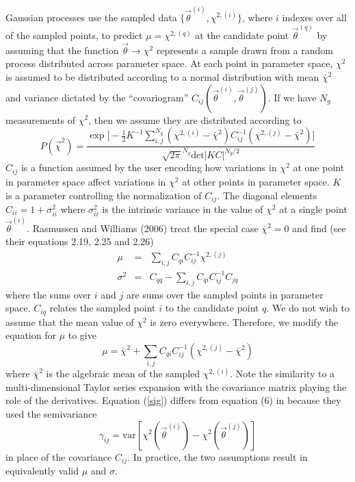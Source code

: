 \documentclass[useAMS,usenatbib]{aastex}
\begin{document}
Gaussian processes use the sampled data $\{\vec{\theta}^{(i)},\chi^{2,(i)}\}$, 
where $i$ indexes over all of the sampled points, to predict
$\mu=\chi^{2,(q)}$ at the candidate point 
$\vec{\theta}^{(q)}$ by assuming that the function
$\vec{\theta}\rightarrow\chi^2$ represents a sample drawn from a random process 
distributed
across parameter space.  At each point in parameter space, 
$\chi^2$ is assumed to be
distributed according to a normal distribution with mean 
$\bar{\chi}^2$
and variance dictated by the ``covariogram''
$C_{ij}(\vec{\theta}^{(i)},\vec{\theta}^{(j)})$.
If we have $N_g$ measurements of $\chi^2$, then we assume
they are distributed according to
\begin{equation}
\label{eqn:likelihood}
P(\vec{\chi}^2)=
\frac{\exp\bigg[-\frac{1}{2}K^{-1}\sum_{i,j}^{N_g}
(\chi^{2,(i)}-\bar{\chi}^2)C^{-1}_{ij}
(\chi^{2,(j)}-\bar{\chi}^2)\bigg]}{\sqrt{2\pi}^{N_g}\text{det}|KC|^{N_g/2}}
\end{equation}
$C_{ij}$ is a function assumed by the user encoding how variations in
$\chi^2$ at one point in parameter space affect variations in 
$\chi^2$ at other
points in parameter space.  $K$ is a parameter controlling the
normalization of $C_{ij}$.
The diagonal elements $C_{ii}=1+\sigma^2_{ii}$ where 
$\sigma^2_{ii}$ is the intrinsic variance in the value
of $\chi^2$ at a single point $\vec{\theta}^{(i)}$.  
Rasmussen and Williams (2006) treat 
the special case
$\bar{\chi}^2=0$ and find (see their equations 2.19, 2.25 and 2.26)
\begin{eqnarray}
\mu&=&\sum_{i,j} C_{qi}C^{-1}_{ij}\chi^{2,(j)}\nonumber\\
\sigma^2&=&C_{qq}-\sum_{i,j}C_{qi}C^{-1}_{ij}C_{jq}\label{sig}
\end{eqnarray}
where the sums over $i$ and $j$ are sums over the sampled points 
in parameter space.  $C_{iq}$ relates the sampled point $i$ to the candidate
point $q$.
We do not wish to assume that the mean value of $\chi^2$ is zero everywhere.
Therefore, we modify the equation for $\mu$ to give
\begin{equation}
\label{mu}
\mu=\bar{\chi}^2+\sum_{i,j} C_{qi}C^{-1}_{ij}
(\chi^{2,(j)}-\bar{\chi}^2)
\end{equation}
where $\bar{\chi}^2$ is the algebraic mean of the 
sampled $\chi^{2,(i)}$.
Note the similarity to a multi-dimensional Taylor series expansion with the
covariance matrix playing the role of the derivatives.
Equation (\ref{sig}) differs from equation (6) in \cite{bryan} because
they used the semivariance
$$\gamma_{ij}=\text{var}[\chi^2(\vec{\theta}^{(i)})
-\chi^2(\vec{\theta}^{(j)})]$$
in place of the covariance $C_{ij}$.  In practice, the two assumptions result in
equivalently valid $\mu$ and $\sigma$.
\end{document}
